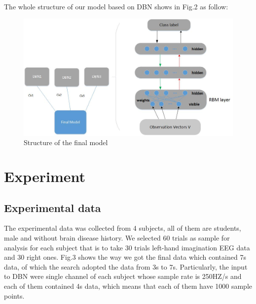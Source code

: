 \documentclass{llncs}
\begin{document}
The whole structure of our model based on DBN shows in Fig.2 as follow:
\begin{figure}[!htbp]
	\centering 
		\includegraphics[scale=0.36]{figs/ax11.jpg}
		\caption{Structure of the final model} 
    	\label{fig:2}
\end{figure}


\section{Experiment}
\subsection{Experimental data}
The experimental data was collected from 4 subjects, all of them are students, male and without brain disease history. We selected 60 trials as sample for analysis for each subject that is to take 30 trials left-hand imagination EEG data and 30 right ones. Fig.3 shows the way we got the final data which contained 7s data, of which the search adopted the data from 3s to 7s. Particularly, the input to DBN were single channel of each subject whose sample rate is 250HZ/s and each of them contained 4s data, which means that each of them have 1000 sample points. 
\end{document}
